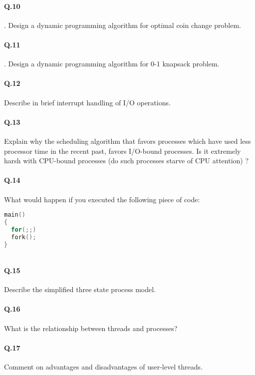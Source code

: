 \documentclass[a4paper,10pt]{article}
\begin{document}
\paragraph{Q.10}. Design a dynamic programming algorithm for optimal coin change
problem.

\paragraph{Q.11}. Design a dynamic programming algorithm for 0-1 knapsack
problem.

\paragraph{Q.12}
Describe in brief interrupt handling of I/O operations.

\paragraph{Q.13}
Explain why the scheduling algorithm that favors processes which have used
less processor time in the recent past, favors I/O-bound processes.
Is it extremely harsh with CPU-bound processes (do such processes starve of CPU
attention) ?

\paragraph{Q.14}
What would happen if you executed the following piece of code:
\begin{lstlisting}[language = c, frame = single]
main()
{
  for(;;)
  fork();
}
   
\end{lstlisting}

\paragraph{Q.15}
Describe the simplified three state process model.

\paragraph{Q.16}
What is the relationship between threads and processes?

\paragraph{Q.17}
Comment on advantages and disadvantages of user-level threads.
\end{document}
